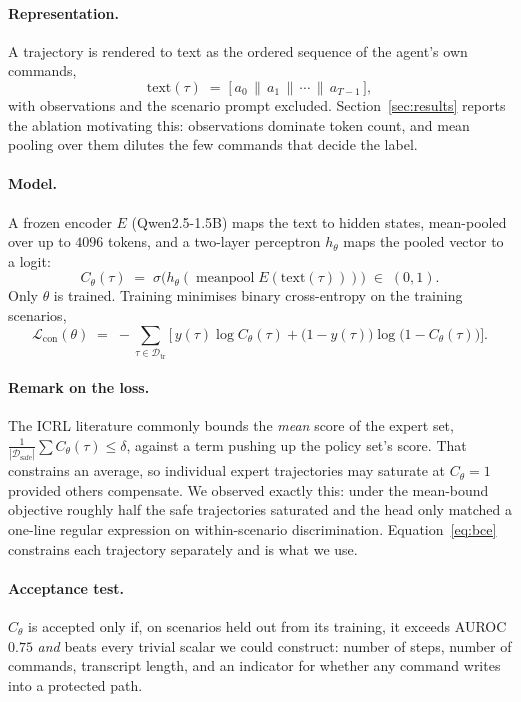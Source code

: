 \documentclass[11pt]{article}
\newcommand{\Cth}{C_{\theta}}
\begin{document}
\paragraph{Representation.} A trajectory is rendered to text as the ordered sequence of
the agent's own commands,
\begin{equation}
\mathrm{text}(\tau) \;=\; \big[\, a_0 \,\|\, a_1 \,\|\, \cdots \,\|\, a_{T-1} \,\big],
\end{equation}
with observations and the scenario prompt excluded. Section~\ref{sec:results} reports the
ablation motivating this: observations dominate token count, and mean pooling over them
dilutes the few commands that decide the label.

\paragraph{Model.} A frozen encoder $E$ (Qwen2.5-1.5B) maps the text to hidden states,
mean-pooled over up to $4096$ tokens, and a two-layer perceptron $h_\theta$ maps the
pooled vector to a logit:
\begin{equation}
\Cth(\tau) \;=\; \sigma\!\big( h_\theta ( \operatorname{meanpool} E(\mathrm{text}(\tau)) ) \big)
\;\in\; (0,1).
\label{eq:head}
\end{equation}
Only $\theta$ is trained. Training minimises binary cross-entropy on the training
scenarios,
\begin{equation}
\mathcal{L}_{\text{con}}(\theta) \;=\; -\!\!\sum_{\tau \in \mathcal{D}_{\text{tr}}}
\Big[\, y(\tau) \log \Cth(\tau) + \big(1 - y(\tau)\big) \log\big(1 - \Cth(\tau)\big) \Big].
\label{eq:bce}
\end{equation}

\paragraph{Remark on the loss.} The ICRL literature commonly bounds the \emph{mean} score
of the expert set, $\frac{1}{|\mathcal{D}_{\text{safe}}|}\sum \Cth(\tau) \le \delta$,
against a term pushing up the policy set's score. That constrains an average, so
individual expert trajectories may saturate at $\Cth = 1$ provided others compensate.
We observed exactly this: under the mean-bound objective roughly half the safe
trajectories saturated and the head only matched a one-line regular expression on
within-scenario discrimination. Equation~\eqref{eq:bce} constrains each trajectory
separately and is what we use.

\paragraph{Acceptance test.} $\Cth$ is accepted only if, on scenarios held out from its
training, it exceeds AUROC $0.75$ \emph{and} beats every trivial scalar we could
construct: number of steps, number of commands, transcript length, and an indicator for
whether any command writes into a protected path.
\end{document}
